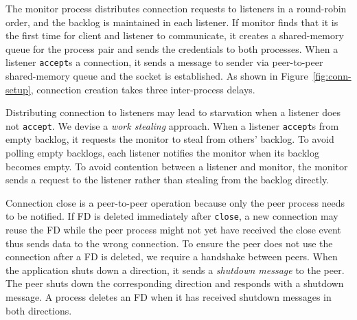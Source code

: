 The monitor process distributes connection requests to listeners in a round-robin order, and the backlog is maintained in each listener. If monitor finds that it is the first time for client and listener to communicate, it creates a shared-memory queue for the process pair and sends the credentials to both processes. When a listener \texttt{accept}s a connection, it sends a message to sender via peer-to-peer shared-memory queue and the socket is established. As shown in Figure~\ref{fig:conn-setup}, connection creation takes three inter-process delays.

Distributing connection to listeners may lead to starvation when a listener does not \texttt{accept}. We devise a \textit{work stealing} approach. When a listener \texttt{accept}s from empty backlog, it requests the monitor to steal from others' backlog. To avoid polling empty backlogs, each listener notifies the monitor when its backlog becomes empty. To avoid contention between a listener and monitor, the monitor sends a request to the listener rather than stealing from the backlog directly.


Connection close is a peer-to-peer operation because only the peer process needs to be notified. If FD is deleted immediately after \texttt{close}, a new connection may reuse the FD while the peer process might not yet have received the close event thus sends data to the wrong connection. To ensure the peer does not use the connection after a FD is deleted, we require a handshake between peers.
When the application shuts down a direction, it sends a \textit{shutdown message} to the peer. The peer shuts down the corresponding direction and responds with a shutdown message. A process deletes an FD when it has received shutdown messages in both directions.


